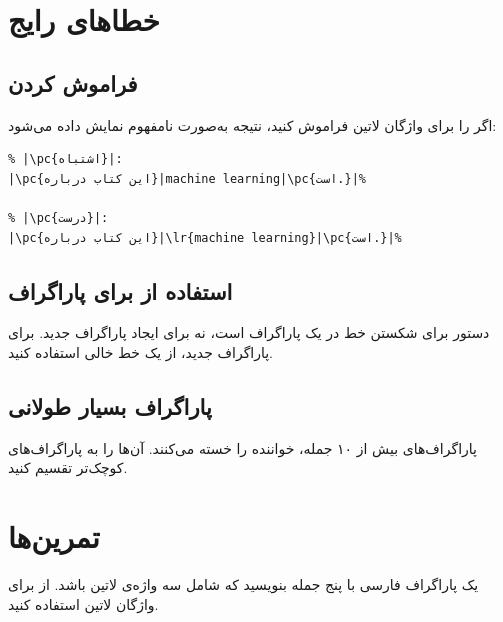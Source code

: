 

\section{خطاهای رایج}
\label{sec:text-mistakes}

\subsection{فراموش کردن }
\label{sec:text-mistake-lr}

اگر  را برای واژگان لاتین فراموش کنید،
نتیجه به‌صورت نامفهوم نمایش داده می‌شود:

\begin{latin}
\begin{verbatim}
% |\pc{اشتباه}|:
|\pc{این کتاب درباره}|machine learning|\pc{است.}|%

% |\pc{درست}|:
|\pc{این کتاب درباره}|\lr{machine learning}|\pc{است.}|%
\end{verbatim}
\end{latin}

\subsection{استفاده از \cmd{\textbackslash\textbackslash} برای پاراگراف}
\label{sec:text-mistake-parbreak}

دستور \cmd{\textbackslash\textbackslash} برای شکستن
خط در یک پاراگراف است، نه برای ایجاد پاراگراف
جدید. برای پاراگراف جدید، از یک خط خالی
استفاده کنید.

\subsection{پاراگراف بسیار طولانی}
\label{sec:text-mistake-longpara}

پاراگراف‌های بیش از ۱۰ جمله، خواننده را خسته
می‌کنند. آن‌ها را به پاراگراف‌های کوچک‌تر
تقسیم کنید.

\section{تمرین‌ها}
\label{sec:text-exercises}

\begin{exercise}
    یک پاراگراف فارسی با پنج جمله بنویسید
    که شامل سه واژه‌ی لاتین باشد. از
     برای واژگان لاتین استفاده کنید.
    \label{exc:text-paragraph}
\end{exercise}

